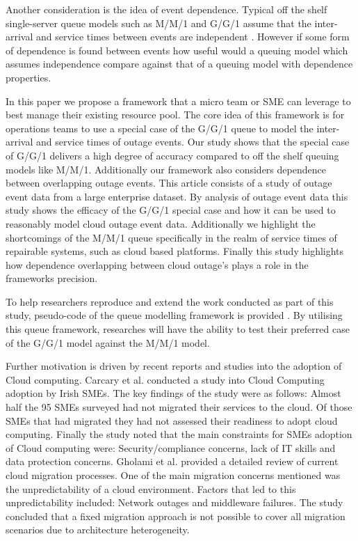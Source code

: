 \documentclass[5p]{elsarticle}
\begin{document}
Another consideration is the idea of event dependence. Typical off the shelf single-server queue models such as M/M/1 and G/G/1 assume that the inter-arrival and service times between events are independent \cite{MM1}. However if some form of dependence is found between events how useful would a queuing model which assumes independence compare against that of a queuing model with dependence properties.

In this paper we propose a framework that a micro team or SME can leverage to best manage their existing resource pool. The core idea of this framework is for operations teams to use a special case of the G/G/1 queue to model the inter-arrival and service times of outage events. Our study shows that the special case of G/G/1 delivers a high degree of accuracy compared to off the shelf queuing models like M/M/1. Additionally our framework also considers dependence between overlapping outage events. This article consists of a study of outage event data from a large enterprise dataset. By analysis of outage event data this study shows the efficacy of the G/G/1 special case and how it can be used to reasonably model cloud outage event data. Additionally we highlight the shortcomings of the M/M/1 queue specifically in the realm of service times of repairable systems, such as cloud based platforms. Finally this study highlights how dependence overlapping between cloud outage's plays a role in the frameworks precision.

To help researchers reproduce and extend the work conducted as part of this study, pseudo-code of the queue modelling framework is provided . By utilising this queue framework, researches will have the ability to test their preferred case of the G/G/1 model against the M/M/1 model.

Further motivation is driven by recent reports and studies into the adoption of Cloud computing.  Carcary et al. \cite{carcary2014adoption} conducted a study into Cloud Computing adoption by Irish SMEs. The key findings of the study were as follows: Almost half the 95 SMEs surveyed had not migrated their services to the cloud. Of those SMEs that had migrated they had not assessed their readiness to adopt cloud computing. Finally the study noted that the main constraints for SMEs adoption of Cloud computing were: Security/compliance concerns, lack of IT skills and data protection concerns. Gholami et al. \cite{gholami2016cloud} provided a detailed review of current cloud migration processes. One of the main migration concerns mentioned was the unpredictability of a cloud environment. Factors that led to this unpredictability included: Network outages and middleware failures. The study concluded that a fixed migration approach is not possible to cover all migration scenarios due to architecture heterogeneity.
\end{document}
